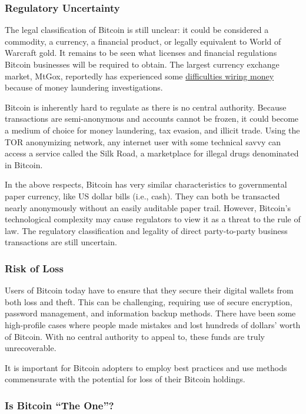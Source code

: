 \documentclass[12pt,twocolumn]{article}
\begin{document}
\subsubsection{Regulatory Uncertainty}

The legal classification of Bitcoin is still unclear: it could be
considered a commodity, a currency, a financial product, or legally
equivalent to World of Warcraft gold. It remains to be seen what
licenses and financial regulations Bitcoin businesses will be required
to obtain. The largest currency exchange market, MtGox, reportedly has
experienced some
\href{https://bitcointalk.org/index.php?topic=52846.msg635859#msg635859}{difficulties
wiring money} because of money laundering investigations.

Bitcoin is inherently hard to regulate as there is no central authority.
Because transactions are semi-anonymous and accounts cannot be frozen,
it could become a medium of choice for money laundering, tax evasion,
and illicit trade. Using the TOR anonymizing network, any internet user
with some technical savvy can access a service called the Silk Road, a
marketplace for illegal drugs denominated in Bitcoin.

In the above respects, Bitcoin has very similar characteristics to
governmental paper currency, like US dollar bills (i.e., cash). They can
both be transacted nearly anonymously without an easily auditable paper
trail. However, Bitcoin's technological complexity may cause regulators
to view it as a threat to the rule of law. The regulatory classification
and legality of direct party-to-party business transactions are still
uncertain.

\subsubsection{Risk of Loss}

Users of Bitcoin today have to ensure that they secure their digital
wallets from both loss and theft. This can be challenging, requiring use
of secure encryption, password management, and information backup
methods. There have been some high-profile cases where people made
mistakes and lost hundreds of dollars' worth of Bitcoin. With no central
authority to appeal to, these funds are truly unrecoverable.

It is important for Bitcoin adopters to employ best practices and use
methods commensurate with the potential for loss of their Bitcoin
holdings.

\subsubsection{Is Bitcoin ``The One''?}
\end{document}
